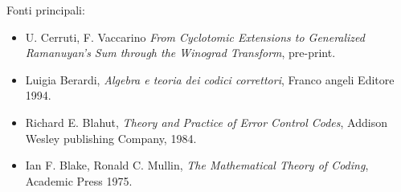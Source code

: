 \documentclass[mathserif]{beamer}
\begin{document}
\thispagestyle{empty}
\begin{frame}
Fonti principali:
    \begin{itemize}
      \item U. Cerruti, F. Vaccarino \emph{From Cyclotomic Extensions to Generalized
	    Ramanuyan's Sum through the Winograd Transform}, pre-print.    
      \item Luigia Berardi, \emph{Algebra e teoria dei codici correttori}, Franco angeli
	    Editore 1994.
      \item Richard E. Blahut, \emph{Theory and Practice of Error Control Codes}, 
	    Addison Wesley publishing Company, 1984.
      \item Ian F. Blake, Ronald C. Mullin, \emph{The Mathematical Theory of Coding},
	    Academic Press 1975.
      
    \end{itemize}
\end{frame}
\end{document}
